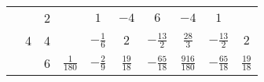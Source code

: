 \begin{table}[H]
\begin{tabular}{|c|c|c|c|c|c|c|c|c|c|}
                                                          & \multirow{3}{*}{4}           & 2                           &                  & $1$              & $-4$            & $6$              & $-4$              & $1$                &                  \\ \cline{3-10}
                                                          &                              & 4                           &                  & $-\frac{1}{6}$   & $2$             & $-\frac{13}{2}$  & $\frac{28}{3}$    & $-\frac{13}{2}$    & $2$              \\ \cline{3-10}
                                                          &                              & 6                           & $\frac{1}{180}$  & $-\frac{2}{9}$   & $\frac{19}{18}$ & $-\frac{65}{18}$ & $\frac{916}{180}$ & $-\frac{65}{18}$   & $\frac{19}{18}$  \\ \hline


\end{tabular}
\end{table}
